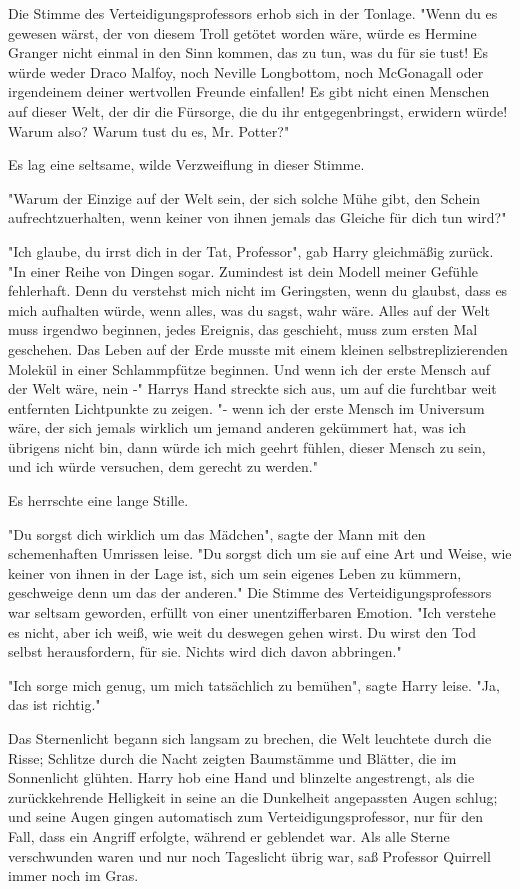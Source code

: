 {Die Stimme des Verteidigungsprofessors erhob sich in der Tonlage. "Wenn du es gewesen wärst, der von diesem Troll getötet worden wäre, würde es Hermine Granger nicht einmal in den Sinn kommen, das zu tun, was du für sie tust! Es würde weder Draco Malfoy, noch Neville Longbottom, noch McGonagall oder irgendeinem deiner wertvollen Freunde einfallen! Es gibt nicht einen Menschen auf dieser Welt, der dir die Fürsorge, die du ihr entgegenbringst, erwidern würde! Warum also? Warum tust du es, Mr. Potter?"

Es lag eine seltsame, wilde Verzweiflung in dieser Stimme.

"Warum der Einzige auf der Welt sein, der sich solche Mühe gibt, den Schein aufrechtzuerhalten, wenn keiner von ihnen jemals das Gleiche für dich tun wird?"

"Ich glaube, du irrst dich in der Tat, Professor", gab Harry gleichmäßig zurück. "In einer Reihe von Dingen sogar. Zumindest ist dein Modell meiner Gefühle fehlerhaft. Denn du verstehst mich nicht im Geringsten, wenn du glaubst, dass es mich aufhalten würde, wenn alles, was du sagst, wahr wäre. Alles auf der Welt muss irgendwo beginnen, jedes Ereignis, das geschieht, muss zum ersten Mal geschehen. Das Leben auf der Erde musste mit einem kleinen selbstreplizierenden Molekül in einer Schlammpfütze beginnen. Und wenn ich der erste Mensch auf der Welt wäre, nein -" Harrys Hand streckte sich aus, um auf die furchtbar weit entfernten Lichtpunkte zu zeigen. "- wenn ich der erste Mensch im Universum wäre, der sich jemals wirklich um jemand anderen gekümmert hat, was ich übrigens nicht bin, dann würde ich mich geehrt fühlen, dieser Mensch zu sein, und ich würde versuchen, dem gerecht zu werden."

Es herrschte eine lange Stille.

"Du sorgst dich wirklich um das Mädchen", sagte der Mann mit den schemenhaften Umrissen leise. "Du sorgst dich um sie auf eine Art und Weise, wie keiner von ihnen in der Lage ist, sich um sein eigenes Leben zu kümmern, geschweige denn um das der anderen." Die Stimme des Verteidigungsprofessors war seltsam geworden, erfüllt von einer unentzifferbaren Emotion. "Ich verstehe es nicht, aber ich weiß, wie weit du deswegen gehen wirst. Du wirst den Tod selbst herausfordern, für sie. Nichts wird dich davon abbringen."

"Ich sorge mich genug, um mich tatsächlich zu bemühen", sagte Harry leise. "Ja, das ist richtig."

Das Sternenlicht begann sich langsam zu brechen, die Welt leuchtete durch die Risse; Schlitze durch die Nacht zeigten Baumstämme und Blätter, die im Sonnenlicht glühten. Harry hob eine Hand und blinzelte angestrengt, als die zurückkehrende Helligkeit in seine an die Dunkelheit angepassten Augen schlug; und seine Augen gingen automatisch zum Verteidigungsprofessor, nur für den Fall, dass ein Angriff erfolgte, während er geblendet war. Als alle Sterne verschwunden waren und nur noch Tageslicht übrig war, saß Professor Quirrell immer noch im Gras.

}

